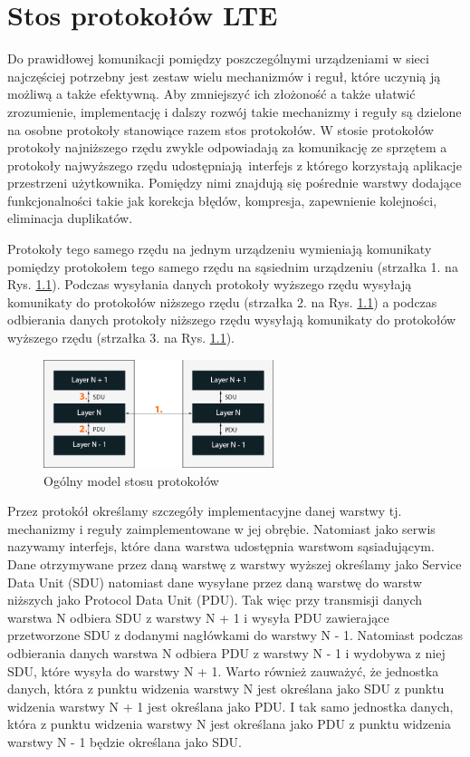 \chapter{Stos protokołów LTE}
\label{cha:protokoly}

Do prawidłowej komunikacji pomiędzy poszczególnymi urządzeniami w sieci najczęściej potrzebny jest zestaw wielu mechanizmów i reguł, które uczynią ją możliwą a także efektywną. Aby zmniejszyć ich złożoność a także ułatwić zrozumienie, implementację i dalszy rozwój takie mechanizmy i reguły są dzielone na osobne protokoły stanowiące razem stos protokołów. W stosie protokołów protokoły najniższego rzędu zwykle odpowiadają za komunikację ze sprzętem a protokoły najwyższego rzędu udostępniają interfejs z którego korzystają aplikacje przestrzeni użytkownika. Pomiędzy nimi znajdują się pośrednie warstwy dodające funkcjonalności takie jak korekcja błędów, kompresja, zapewnienie kolejności, eliminacja duplikatów.

Protokoły tego samego rzędu na jednym urządzeniu wymieniają komunikaty pomiędzy protokołem tego samego rzędu na sąsiednim urządzeniu (strzałka 1. na Rys. \ref{fig:protocols_stack}). Podczas wysyłania danych protokoły wyższego rzędu wysyłają komunikaty do protokołów niższego rzędu (strzałka 2. na Rys. \ref{fig:protocols_stack}) a podczas odbierania danych protokoły niższego rzędu wysyłają komunikaty do protokołów wyższego rzędu (strzałka 3. na Rys. \ref{fig:protocols_stack}). 

\begin{figure}
	\centerline{\includegraphics[width=0.6\textwidth]{images/protocols.png}}
	\caption{Ogólny model stosu protokołów}
	\label{fig:protocols_stack}
\end{figure}

Przez protokół określamy szczegóły implementacyjne danej warstwy tj. mechanizmy i reguły zaimplementowane w jej obrębie. Natomiast jako serwis nazywamy interfejs, które dana warstwa udostępnia warstwom sąsiadującym. \cite{Ahm13} Dane otrzymywane przez daną warstwę z warstwy wyższej określamy jako Service Data Unit (SDU) natomiast dane wysyłane przez daną warstwę do warstw niższych jako Protocol Data Unit (PDU). 
Tak więc przy transmisji danych warstwa N odbiera SDU z warstwy N + 1 i wysyła PDU zawierające przetworzone SDU z dodanymi nagłówkami do warstwy N - 1. Natomiast podczas odbierania danych warstwa N odbiera PDU z warstwy N - 1 i wydobywa z niej SDU, które wysyła do warstwy N + 1. Warto również zauważyć, że jednostka danych, która z punktu widzenia warstwy N jest określana jako SDU z punktu widzenia warstwy N + 1 jest określana jako PDU. I tak samo jednostka danych, która z punktu widzenia warstwy N jest określana jako PDU z punktu widzenia warstwy N - 1 będzie określana jako SDU.

